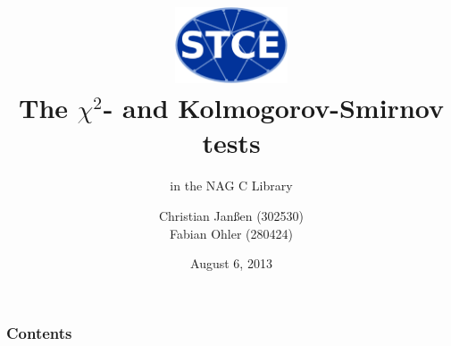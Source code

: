 \documentclass{beamer}
\begin{document}
\title{\centering
\includegraphics[width=0.25\textwidth]{./figures/logo.eps} \\ The $\chi^2$- and Kolmogorov-Smirnov tests}

\subtitle{in the NAG C Library}
\author{Christian Janßen (302530) \\ Fabian Ohler (280424) }
\date{August 6, 2013}
\date{}
\frame[plain]{\titlepage}

\begin{frame}
\frametitle{Contents}
\end{frame}
\end{document}
